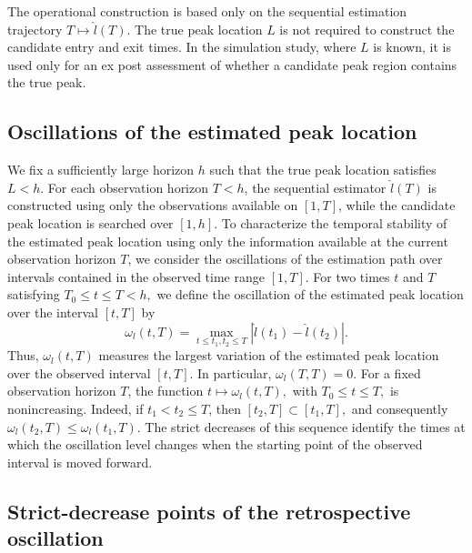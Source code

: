 \documentclass[12pt,a4paper]{article}
\begin{document}
The operational construction is based only on the sequential estimation trajectory
\(
T\longmapsto\hat{l}(T).
\)
The true peak location \(L\) is not required to construct the candidate entry and exit times. In the simulation study, where \(L\) is known, it is used only for an ex post assessment of whether a candidate peak region contains the true peak.

\subsection{Oscillations of the estimated peak location}
\label{subsec:oscillations}

We fix a sufficiently large horizon \(h\) such that the true peak location satisfies
\(L<h\). For each observation horizon \(T<h\), the sequential estimator \(\hat{l}(T)\) is constructed using only the observations available on \([1,T]\), while the candidate peak location is searched over \([1,h]\).
To characterize the temporal stability of the estimated peak location using only the information available at the current observation horizon \(T\), we consider the oscillations of the estimation path over intervals contained in the observed time range \([1,T]\). For two times \(t\) and \(T\) satisfying
\(
T_0\leq t\leq T<h,
\)
we define the oscillation of the estimated peak location over the interval \([t,T]\) by
\begin{equation}
	\omega_l(t,T)
	=
	\max_{t\leq t_1,t_2\leq T}
	\left|
	\hat{l}(t_1)-\hat{l}(t_2)
	\right|.
	\label{eq:local_oscillation}
\end{equation}
Thus, \(\omega_l(t,T)\) measures the largest variation of the estimated peak location over the observed interval \([t,T]\). In particular,
\(
\omega_l(T,T)=0.
\)
For a fixed observation horizon \(T\), the function
$t\longmapsto\omega_l(t,T),$
with
$T_0\leq t\leq T,$
is nonincreasing. Indeed, if \(t_1<t_2\leq T\), then
\(
[t_2,T]\subset[t_1,T],
\)
and consequently
\(
\omega_l(t_2,T)\leq\omega_l(t_1,T).
\)
The strict decreases of this sequence identify the times at which the oscillation level changes when the starting point of the observed interval is moved forward.

\subsection{Strict-decrease points of the retrospective oscillation}
\label{subsec:strict-decrease-points}
\end{document}
